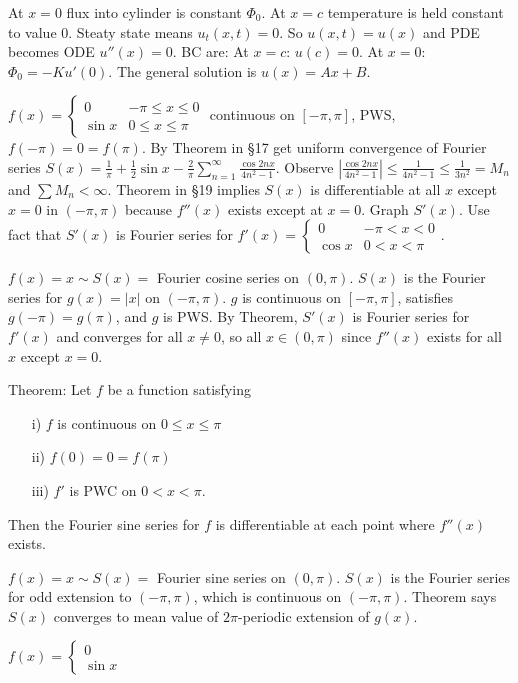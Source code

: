 \documentclass[]{article}
\begin{document}
\begin{example}
	 At $x=0$ flux into cylinder is constant $\Phi_0$. At $x=c$ temperature is held constant to value 0. Steaty state means $u_t(x,t) = 0$. So $u(x,t) = u(x)$ and PDE becomes ODE $u''(x)=0$. BC are: At $x=c$: $u(c) =0$. At $x=0$: $\Phi_0 = -K u'(0)$. The general solution is $u(x) = Ax+B$.
\end{example}
\begin{example}
	[HW Sec. 20, 1] $ f(x) = \begin{cases} 0 & -\pi \leq x \leq 0 \\ \sin{x} & 0\leq x \leq \pi \end{cases}$ continuous on $[-\pi,\pi]$, PWS, $f(-\pi)=0=f(\pi)$. By Theorem in \S 17 get uniform convergence of Fourier series $S(x) = \frac{1}{\pi} + \frac{1}{2} \sin{x} - \frac{2}{\pi} \sum_{n=1}^\infty \frac{\cos{2nx}}{4n^2-1}$. Observe $\left| \frac{\cos{2nx}}{4n^2-1} \right| \leq \frac{1}{4n^2 -1} \leq \frac{1}{3n^2} = M_n$ and $\sum M_n <\infty$.
	Theorem in \S 19 implies $S(x)$ is differentiable at all $x$ except $x=0$ in $(-\pi,\pi)$ because $f''(x) $ exists except at $x=0$.
	Graph $S'(x)$. Use fact that $S'(x)$ is Fourier series for %
	$f'(x) = \begin{cases} 0 & -\pi < x < 0 \\ \cos{x} & 0<x<\pi \end{cases}$.
\end{example}
\begin{example}
	[HW \S 20, 2] $f(x) = x \sim S(x) = $ Fourier cosine series on $(0,\pi)$. $S(x)$ is the Fourier series for $g(x) = |x|$ on $(-\pi,\pi)$. $g$ is continuous on $[-\pi,\pi]$, satisfies $g(-\pi) = g(\pi)$, and $g$ is PWS. By Theorem, $S'(x)$ is Fourier series for $f'(x)$ and converges for all $x\neq 0$, so all $x\in(0,\pi)$ since $f''(x)$ exists for all $x$ except $x=0$.
\end{example}
\begin{example}
	[HW \S 20, \#3] Theorem: Let $f$ be a function satisfying
	\begin{enumerate}
		\item[i)] $f$ is continuous on $0\leq x \leq \pi$
		\item[ii)] $f(0) = 0 = f(\pi)$
		\item[iii)] $f'$ is PWC on $0<x<\pi$.
	\end{enumerate}
	Then the Fourier sine series for $f$ is differentiable at each point where $f''(x)$ exists.
\end{example}
\begin{example}
	[HW \S 14, \#1] $f(x) = x \sim S(x) = $ Fourier sine series on $(0,\pi)$. $S(x)$ is the Fourier series for odd extension to $(-\pi,\pi)$, which is continuous on $(-\pi,\pi)$. Theorem says $S(x)$ converges to mean value of $2\pi$-periodic extension of $g(x)$.
\end{example}
\begin{example}
	[HW \S 14, \#4] $f(x) = \begin{cases} 0 \\ \sin{x} \end{cases}$
\end{example}
\end{document}
